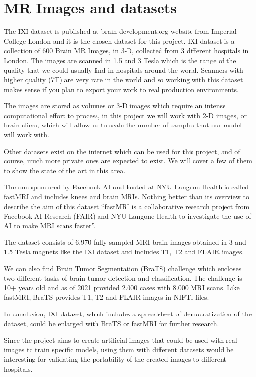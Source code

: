 \section*{MR Images and datasets}

The IXI dataset is published at brain-development.org website from Imperial College London and it is the chosen dataset for this project. IXI dataset is a collection of 600 Brain MR Images, in 3-D, collected from 3 different hospitals in London. The images are scanned in 1.5 and 3 Tesla which is the range of the quality that we could usually find in hospitals around the world. Scanners with higher quality (7T) are very rare in the world and so working with this dataset makes sense if you plan to export your work to real production environments.

The images are stored as volumes or 3-D images which require an intense computational effort to process, in this project we will work with 2-D images, or brain slices, which will allow us to scale the number of samples that our model will work with.

Other datasets exist on the internet which can be used for this project, and of course, much more private ones are expected to exist. We will cover a few of them to show the state of the art in this area.

The one sponsored by Facebook AI and hosted at NYU Langone Health is called fastMRI and includes knees and brain MRIs. Nothing better than its overview to describe the aim of this dataset “fastMRI is a collaborative research project from Facebook AI Research (FAIR) and NYU Langone Health to investigate the use of AI to make MRI scans faster”. 

The dataset consists of 6.970 fully sampled MRI brain images obtained in 3 and 1.5 Tesla magnets like the IXI dataset and includes T1, T2 and FLAIR images.

We can also find Brain Tumor Segmentation (BraTS) challenge which encloses two different tasks of brain tumor detection and classification. The challenge is 10+ years old and as of 2021 provided 2.000 cases with 8.000 MRI scans. Like fastMRI, BraTS provides T1, T2 and FLAIR images in NIFTI files.

In conclusion, IXI dataset, which includes a spreadsheet of democratization of the dataset, could be enlarged with BraTS or fastMRI for further research.

Since the project aims to create artificial images that could be used with real images to train specific models, using them with different datasets would be interesting for validating the portability of the created images to different hospitals. 